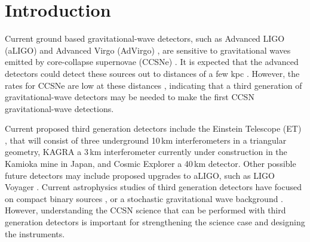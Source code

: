\documentclass[letterpaper, aps, prd, twocolumn, superscriptaddress, showpacs, nofootinbib]{revtex4}
\begin{document}
\section{Introduction}
\label{sec:intro}

Current ground based gravitational-wave detectors, such as Advanced LIGO (aLIGO) \cite{aLIGO} and Advanced Virgo (AdVirgo) \cite{AdVirgo}, are sensitive to gravitational waves emitted by core-collapse supernovae (CCSNe) \cite{2016arXiv160501785A, 2016PhRvD..93d2002G}. It is expected that the advanced detectors could detect these sources out to distances of a few kpc \cite{2016PhRvD..93d2002G, 2017PhRvD..96l3013P}. However, the rates for CCSNe are low at these distances \cite{1991ARA&A..29..363V, 1993A&A...273..383C, Alexeyev2002}, indicating that a third generation of gravitational-wave detectors may be needed to make the first CCSN gravitational-wave detections. 

Current proposed third generation detectors include the Einstein Telescope (ET) \cite{0264-9381-27-19-194002}, that will consist of three underground 10\,km interferometers in a triangular geometry, KAGRA \cite{2013PhRvD..88d3007A} a 3\,km interferometer currently under construction in the Kamioka mine in Japan, and Cosmic Explorer \cite{2017CQGra..34d4001A} a 40\,km detector. Other possible future detectors may include proposed upgrades to aLIGO, such as LIGO Voyager \cite{2015PhRvD..91h2001D}. Current astrophysics studies of third generation detectors have focused on compact binary sources \cite{2018PhRvD..97l3014C, 2018PhRvD..97f4031Z, 2017PhRvD..95f4052V}, or a stochastic gravitational wave background \cite{2017PhRvD..95f3015C}. However, understanding the CCSN science that can be performed with third generation detectors is important for strengthening the science case and designing the instruments.  
\end{document}
